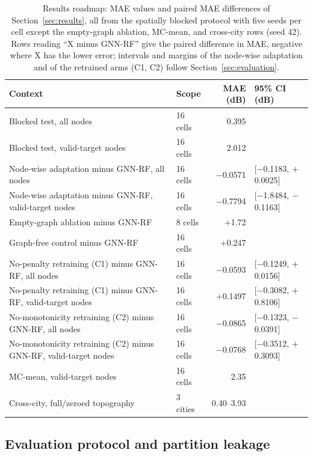 \documentclass{ieeeaccess}
\begin{document}
\begin{table}[!t]
\centering
\caption{Results roadmap: MAE values and paired MAE differences of Section~\ref{sec:results}, all from the spatially blocked protocol with five seeds per cell except the empty-graph ablation, MC-mean, and cross-city rows (seed 42). Rows reading ``X minus GNN-RF'' give the paired difference in MAE, negative where X has the lower error; intervals and margins of the node-wise adaptation and of the retrained arms (C1, C2) follow Section~\ref{sec:evaluation}.}
\label{tab:results_roadmap}
\setlength{\tabcolsep}{3pt}
\begin{tabular}{@{}>{\raggedright\arraybackslash}p{3.3cm}lrl@{}}
\toprule
Context & Scope & MAE (dB) & 95\% CI (dB) \\
\midrule
Blocked test, all nodes & 16 cells & 0.395 & \\
Blocked test, valid-target nodes & 16 cells & 2.012 & \\
Node-wise adaptation minus GNN-RF, all nodes & 16 cells & $-$0.0571 & [$-$0.1183, $+$0.0025] \\
Node-wise adaptation minus GNN-RF, valid-target nodes & 16 cells & $-$0.7794 & [$-$1.8484, $-$0.1163] \\
Empty-graph ablation minus GNN-RF & 8 cells & $+$1.72 & \\
Graph-free control minus GNN-RF & 16 cells & $+$0.247 & \\
No-penalty retraining (C1) minus GNN-RF, all nodes & 16 cells & $-$0.0593 & [$-$0.1249, $+$0.0156] \\
No-penalty retraining (C1) minus GNN-RF, valid-target nodes & 16 cells & $+$0.1497 & [$-$0.3082, $+$0.8106] \\
No-monotonicity retraining (C2) minus GNN-RF, all nodes & 16 cells & $-$0.0865 & [$-$0.1323, $-$0.0391] \\
No-monotonicity retraining (C2) minus GNN-RF, valid-target nodes & 16 cells & $-$0.0768 & [$-$0.3512, $+$0.3093] \\
MC-mean, valid-target nodes & 16 cells & 2.35 & \\
Cross-city, full/zeroed topography & 3 cities & 0.40--3.93 & \\
\bottomrule
\end{tabular}
\end{table}

\subsection{Evaluation protocol and partition leakage}
\label{sec:eval_protocol}
\end{document}
